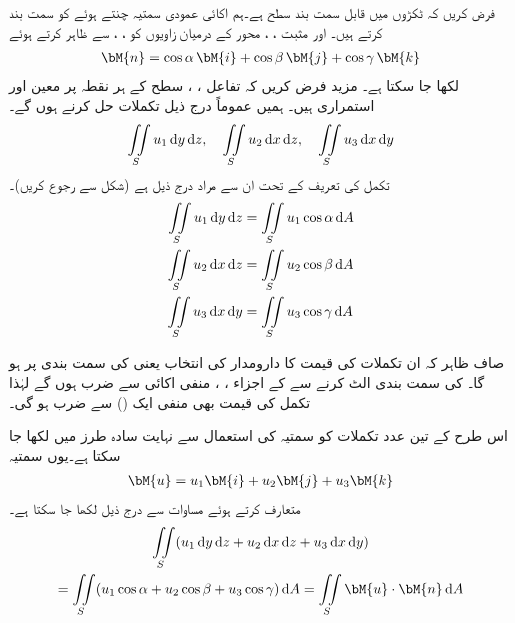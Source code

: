 فرض کریں کہ   ٹکڑوں میں قابل سمت بند سطح ہے۔ہم اکائی عمودی سمتیہ  چنتے ہوئے  کو سمت بند کرتے ہیں۔  اور مثبت ، ،  محور  کے درمیان زاویوں کو ، ،  سے ظاہر کرتے ہوئے
\begin{align}\label{مساوات_خطی_تکمل_اکائی_عمودی_ارکان}
\bM{n}=\cos \alpha \,\bM{i}+\cos \beta \,\bM{j}+\cos \gamma \, \bM{k}
\end{align}
لکھا جا سکتا ہے۔ مزید فرض کریں کہ تفاعل ، ،  سطح   کے ہر نقطہ  پر  معین اور استمراری ہیں۔ ہمیں عموماً درج ذیل تکملات حل کرنے ہوں گے۔
\begin{align*}
\iint\limits_S u_1\dif y\dif z,\quad \iint\limits_S u_2\dif x\dif z,\quad \iint\limits_S u_3\dif x\dif y
\end{align*}
تکمل کی تعریف کے تحت ان سے مراد درج ذیل ہے (شکل  سے رجوع کریں)۔
\begin{gather}
\begin{aligned}\label{مساوات_خطی_تکمل_تین_قسم_کے_تکمل_الف}
\iint\limits_S u_1\dif y\dif z&=\iint\limits_S u_1\cos \alpha \dif A\\
\iint\limits_S u_2\dif x\dif z&=\iint\limits_S u_2\cos \beta \dif A\\
\iint\limits_S u_3\dif x\dif y&=\iint\limits_S u_3\cos \gamma \dif A
\end{aligned}
\end{gather}

صاف ظاہر کہ ان تکملات کی قیمت کا دارومدار  کی انتخاب یعنی  کی سمت بندی پر ہو گا۔ کی سمت بندی الٹ کرنے سے  کے اجزاء ، ،  منفی اکائی سے ضرب ہوں گے لہٰذا  تکمل کی قیمت بھی منفی ایک () سے ضرب ہو گی۔

اس طرح کے تین عدد تکملات کو سمتیہ کی استعمال سے نہایت سادہ طرز میں لکھا جا سکتا ہے۔یوں سمتیہ
\begin{align*}
\bM{u}=u_1\bM{i}+u_2\bM{j}+u_3\bM{k}
\end{align*}
متعارف کرتے ہوئے  مساوات  سے درج ذیل لکھا جا سکتا ہے۔
\begin{multline}\label{مساوات_خطی_تکمل_عمودی_سمتیہ_اجزاء_استعمال}
\iint\limits_S (u_1\dif y\dif z+u_2\dif x\dif z+u_3\dif x\dif y)\\
=\iint\limits_S (u_1\cos \alpha +u_2\cos \beta+u_3\cos \gamma)\dif A=\iint\limits_S \bM{u}\cdot \bM{n}\dif A
\end{multline}

